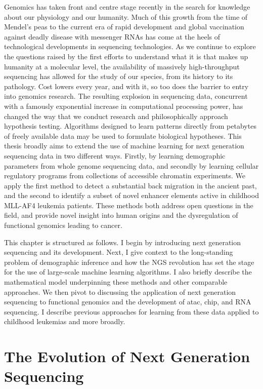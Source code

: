 Genomics has taken front and centre stage recently in the search for knowledge about our physiology and our humanity. Much of this growth from the time of Mendel's peas to the current era of rapid development and global vaccination against deadly disease with messenger RNAs has come at the heels of technological developments in sequencing technologies. As we continue to explore the questions raised by the first efforts to understand what it is that makes up humanity at a molecular level, the availability of massively high-throughput sequencing has allowed for the study of our species, from its history to its pathology. Cost lowers every year, and with it, so too does the barrier to entry into genomics research. The resulting explosion in sequencing data, concurrent with a famously exponential increase in computational processing power, has changed the way that we conduct research and philosophically approach hypothesis testing. Algorithms designed to learn patterns directly from petabytes of freely available data may be used to formulate biological hypotheses. This thesis broadly aims to extend the use of machine learning for next generation sequencing data in two different ways. Firstly, by learning demographic parameters from whole genome sequencing data, and secondly by learning cellular regulatory programs from collections of accessible chromatin experiments. We apply the first method to detect a substantial back migration in the ancient past, and the second to identify a subset of novel enhancer elements active in childhood MLL-AF4 leukemia patients. These methods both address open questions in the field, and provide novel insight into human origins and the dysregulation of functional genomics leading to cancer.

This chapter is structured as follows. I begin by introducing next generation sequencing and its development. Next, I give context to the long-standing problem of demographic inference and how the NGS revolution has set the stage for the use of large-scale machine learning algorithms. I also briefly describe the mathematical model underpinning these methods and other comparable approaches. We then pivot to discussing the application of next generation sequencing to functional genomics and the development of \gls{atac}, \gls{chip}, and RNA sequencing. I describe previous approaches for learning from these data applied to childhood leukemias and more broadly. 


\section{The Evolution of Next Generation Sequencing}

